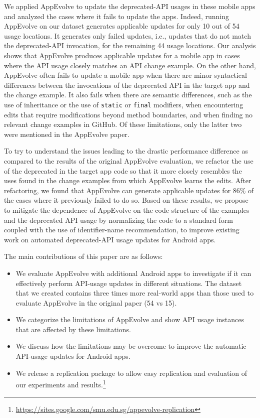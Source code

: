 We applied AppEvolve to update the deprecated-API usages in these mobile
apps and analyzed the cases where it fails to update the apps. Indeed,
running AppEvolve on our dataset generates applicable updates for only 10
out of 54 usage locations.  It generates only failed updates, i.e., updates
that do not match the deprecated-API invocation, for the remaining 44 usage
locations. Our analysis shows that AppEvolve produces applicable updates
for a mobile app in cases where the API usage closely matches an API change
example.  On the other hand, AppEvolve often fails to update a mobile app
when there are minor syntactical differences between the invocations of the
deprecated API in the target app and the change example.  It also fails
when there are semantic differences, such as the use of inheritance or the
use of {\tt static} or {\tt final} modifiers, when encountering edits that
require modifications beyond method boundaries, and when finding no
relevant change examples in GitHub.  Of these limitations, only the latter
two were mentioned in the AppEvolve paper.

To try to understand the issues leading to the drastic performance
difference as compared to the results of the original AppEvolve evaluation,
we refactor the use of the deprecated in the target app code so that it
more closely resembles the uses found in the change examples from which
AppEvolve learns the edits.  After refactoring, we found that AppEvolve can
generate applicable updates for 86\% of the cases where it previously
failed to do so.  Based on these results, we propose to mitigate the
dependence of AppEvolve on the code structure of the examples and the
deprecated API usage by normalizing the code to a standard form coupled
with the use of identifier-name recommendation, to improve existing work on
automated deprecated-API usage updates for Android apps.

The main contributions of this paper are as follows:
\begin{itemize}
	\item We  evaluate AppEvolve with additional Android apps to investigate if it can effectively perform API-usage updates in different situations. The dataset that we created contains three times more real-world apps than those used to evaluate AppEvolve in the original paper (54 vs 15).
	\item We categorize the limitations of AppEvolve and show API usage
	instances that are affected by these limitations.
	\item We discuss how the limitations may be overcome to improve the automatic API-usage updates for Android apps.
	\item We release a replication package to allow easy replication
	and evaluation of our experiments and results.\footnote{\url{https://sites.google.com/smu.edu.sg/appevolve-replication}}
	 
\end{itemize}

